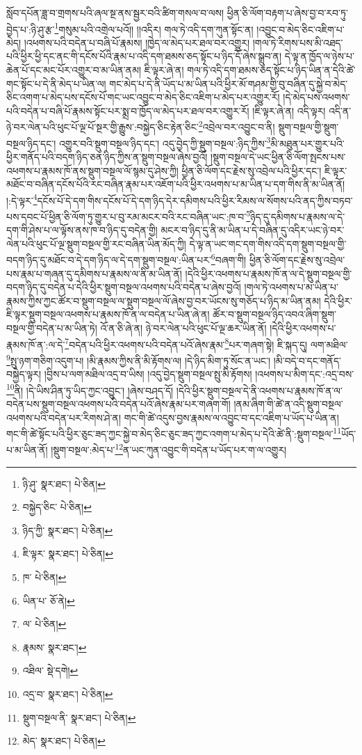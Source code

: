 སློབ་དཔོན་ཟླ་བ་གྲགས་པའི་ཞལ་སྔ་ནས་སྦྱར་བའི་ཚིག་གསལ་བ་ལས། ཕྱིན་ཅི་ལོག་བརྟག་པ་ཞེས་བྱ་བ་རབ་ཏུ་བྱེད་པ་:ཉི་ཤུ་རྩ་\footnote{ཉི་ཤུ་  སྣར་ཐང་།  པེ་ཅིན། }གསུམ་པའི་འགྲེལ་པའོ།། །།འདིར། གལ་ཏེ་འདི་དག་ཀུན་སྟོང་ན། །འབྱུང་བ་མེད་ཅིང་འཇིག་པ་མེད། །འཕགས་པའི་བདེན་པ་བཞི་པོ་རྣམས། །ཁྱེད་ལ་མེད་པར་ཐལ་བར་འགྱུར། །གལ་ཏེ་རིགས་པས་མི་འཐད་པའི་ཕྱིར་ཕྱི་དང་ནང་གི་དངོས་པོའི་རྣམ་པ་འདི་དག་ཐམས་ཅད་སྟོང་པ་ཉིད་དོ་ཞེས་སྒྲུབ་ན། དེ་ལྟ་ན་ཁྱོད་ལ་ཉེས་པ་ཆེན་པོ་དང་མང་པོར་འགྱུར་བ་མ་ཡིན་ནམ། ཇི་ལྟར་ཞེ་ན། གལ་ཏེ་འདི་དག་ཐམས་ཅད་སྟོང་པ་ཉིད་ཡིན་ན་དེའི་ཚེ་གང་སྟོང་པ་དེ་ནི་མེད་པ་ཡིན་ལ། གང་མེད་པ་དེ་ནི་ཡོད་པ་མ་ཡིན་པའི་ཕྱིར་མོ་གཤམ་གྱི་བུ་བཞིན་དུ་སྐྱེ་བ་མེད་ཅིང་འགག་པ་མེད་པས་དངོས་པོ་གང་ཡང་འབྱུང་བ་མེད་ཅིང་འཇིག་པ་མེད་པར་འགྱུར་རོ། །དེ་མེད་པས་འཕགས་པའི་བདེན་པ་བཞི་པོ་རྣམས་སྟོང་པར་སྨྲ་བ་ཁྱོད་ལ་མེད་པར་ཐལ་བར་འགྱུར་རོ། །ཇི་ལྟར་ཞེ་ན། འདི་ལྟར། འདི་ན་ཉེ་བར་ལེན་པའི་ཕུང་པོ་ལྔ་པོ་སྔར་གྱི་རྒྱུས་:བསྐྱེད་ཅིང་རྟེན་ཅིང་\footnote{བསྐྱེད་ཅིང་  པེ་ཅིན། }འབྲེལ་བར་འབྱུང་བ་ནི། སྡུག་བསྔལ་གྱི་སྡུག་བསྔལ་ཉིད་དང་། འགྱུར་བའི་སྡུག་བསྔལ་ཉིད་དང་། འདུ་བྱེད་ཀྱི་སྡུག་བསྔལ་:ཉིད་ཀྱིས་\footnote{ཉིད་ཀྱི་  སྣར་ཐང་།  པེ་ཅིན། }མི་མཐུན་པར་གྱུར་པའི་ཕྱིར་གནོད་པའི་བདག་ཉིད་ཅན་ཉིད་ཀྱིས་ན་སྡུག་བསྔལ་ཞེས་བྱའོ། །སྡུག་བསྔལ་དེ་ཡང་ཕྱིན་ཅི་ལོག་སྤངས་པས་འཕགས་པ་རྣམས་ཁོ་ནས་སྡུག་བསྔལ་ལོ་སྙམ་དུ་ཤེས་ཀྱི། ཕྱིན་ཅི་ལོག་དང་རྗེས་སུ་འབྲེལ་པའི་ཕྱིར་དང་། ཇི་ལྟར་མཐོང་བ་བཞིན་དངོས་པོའི་རང་བཞིན་རྣམ་པར་འཇོག་པའི་ཕྱིར་འཕགས་པ་མ་ཡིན་པ་དག་གིས་ནི་མ་ཡིན་ནོ། །:དེ་ལྟར་\footnote{ཇི་ལྟར་  སྣར་ཐང་།  པེ་ཅིན། }དངོས་པོ་དེ་དག་གིས་དངོས་པོ་དེ་དག་ཉིད་དེར་དམིགས་པའི་ཕྱིར་རིམས་ལ་སོགས་པའི་ནད་ཀྱིས་བཏབ་པས་དབང་པོ་ཕྱིན་ཅི་ལོག་ཏུ་གྱུར་པ་བུ་རམ་མངར་བའི་རང་བཞིན་ཡང་:ཁ་བ་\footnote{ཁ་  པེ་ཅིན། }ཉིད་དུ་དམིགས་པ་རྣམས་ལ་དེ་དག་གི་ཤེས་པ་ལ་ལྟོས་ནས་ཁ་བ་ཉིད་དུ་བདེན་གྱི། མངར་བ་ཉིད་དུ་ནི་མ་ཡིན་པ་དེ་བཞིན་དུ་འདིར་ཡང་ཉེ་བར་ལེན་པའི་ཕུང་པོ་ལྔ་སྡུག་བསྔལ་གྱི་རང་བཞིན་ཡིན་མོད་ཀྱི། དེ་ལྟ་ན་ཡང་གང་དག་གིས་འདི་དག་སྡུག་བསྔལ་གྱི་བདག་ཉིད་དུ་མཐོང་བ་དེ་དག་ཉིད་ལ་དེ་དག་སྡུག་བསྔལ་:ཡིན་པར་\footnote{ཡིན་པ་  ཅོ་ནེ། }བཞག་གི། ཕྱིན་ཅི་ལོག་དང་རྗེས་སུ་འབྲེལ་པས་རྣམ་པ་གཞན་དུ་དམིགས་པ་རྣམས་ལ་ནི་མ་ཡིན་ནོ། །དེའི་ཕྱིར་འཕགས་པ་རྣམས་ཁོ་ན་ལ་དེ་སྡུག་བསྔལ་གྱི་བདག་ཉིད་དུ་བདེན་པ་དེའི་ཕྱིར་སྡུག་བསྔལ་འཕགས་པའི་བདེན་པ་ཞེས་བྱའོ། །གལ་ཏེ་འཕགས་པ་མ་ཡིན་པ་རྣམས་ཀྱིས་ཀྱང་ཚོར་བ་སྡུག་བསྔལ་ལ་སྡུག་བསྔལ་ལོ་ཞེས་བྱ་བར་ཡོངས་སུ་གཅོད་པ་ཉིད་མ་ཡིན་ནམ། དེའི་ཕྱིར་ཇི་ལྟར་སྡུག་བསྔལ་འཕགས་པ་རྣམས་ཁོ་ན་ལ་བདེན་པ་ཡིན་ཞེ་ན། ཚོར་བ་སྡུག་བསྔལ་ཉིད་འབའ་ཞིག་སྡུག་བསྔལ་གྱི་བདེན་པ་མ་ཡིན་ཏེ། འོ་ན་ཅི་ཞེ་ན། ཉེ་བར་ལེན་པའི་ཕུང་པོ་ལྔ་ཆར་ཡིན་ནོ། །དེའི་ཕྱིར་འཕགས་པ་རྣམས་ཁོ་ན་:ལ་དེ་\footnote{ལ་  པེ་ཅིན། }བདེན་པའི་ཕྱིར་འཕགས་པའི་བདེན་པའོ་ཞེས་རྣམ་\footnote{རྣམས་  སྣར་ཐང་། }པར་གཞག་སྟེ། ཇི་སྐད་དུ། ལག་མཐིལ་\footnote{འཐིལ་  སྡེ་དགེ། }སྤུ་ཉག་གཅིག་འདུག་པ། །མི་རྣམས་ཀྱིས་ནི་མི་རྟོགས་ལ། །དེ་ཉིད་མིག་ཏུ་སོང་ན་ཡང་། །མི་བདེ་བ་དང་གནོད་བསྐྱེད་ལྟར། །བྱིས་པ་ལག་མཐིལ་འདྲ་བ་ཡིས། །འདུ་བྱེད་སྡུག་བསྔལ་སྤུ་མི་རྟོགས། །འཕགས་པ་མིག་དང་:འདྲ་བས་\footnote{འདྲ་བ་  སྣར་ཐང་།  པེ་ཅིན། }ནི། །དེ་ཡིས་ཤིན་ཏུ་ཡིད་ཀྱང་འབྱུང་། །ཞེས་བཤད་དོ། །དེའི་ཕྱིར་སྡུག་བསྔལ་དེ་ནི་འཕགས་པ་རྣམས་ཁོ་ན་ལ་བདེན་པས་སྡུག་བསྔལ་འཕགས་པའི་བདེན་པའོ་ཞེས་རྣམ་པར་གཞག་གོ། །ནམ་ཞིག་གི་ཚེ་ན་འདི་སྡུག་བསྔལ་འཕགས་པའི་བདེན་པར་རིགས་ཤེ་ན། གང་གི་ཚེ་འདུས་བྱས་རྣམས་ལ་འབྱུང་བ་དང་འཇིག་པ་ཡོད་པ་ཡིན་ན། གང་གི་ཚེ་སྟོང་པའི་ཕྱིར་ཅུང་ཟད་ཀྱང་སྐྱེ་བ་མེད་ཅིང་ཅུང་ཟད་ཀྱང་འགག་པ་མེད་པ་དེའི་ཚེ་ནི་:སྡུག་བསྔལ་\footnote{སྡུག་བསྔལ་ནི་  སྣར་ཐང་།  པེ་ཅིན། }ཡོད་པ་མ་ཡིན་ནོ། །སྡུག་བསྔལ་:མེད་པ་\footnote{མེད་  སྣར་ཐང་།  པེ་ཅིན། }ན་ཡང་ཀུན་འབྱུང་གི་བདེན་པ་ཡོད་པར་ག་ལ་འགྱུར། 